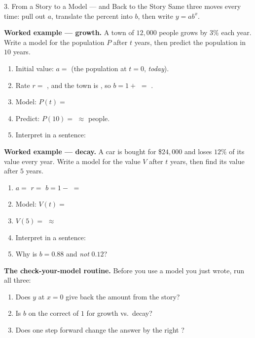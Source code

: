 \documentclass[10pt]{article}
\begin{document}
\begin{notesbox}{3. From a Story to a Model --- and Back to the Story}
Same three moves every time: pull out $a$, translate the percent into $b$, then write $y=ab^{x}$.

\vspace{4pt}
\textbf{Worked example --- growth.} A town of $12{,}000$ people grows by $3\%$ each year. Write a
model for the population $P$ after $t$ years, then predict the population in $10$ years.
\begin{enumerate}[leftmargin=1.7em, itemsep=3pt]
  \item Initial value: $a=$  \quad (the population at $t=0$, \emph{today}).
  \item Rate $r=$ , and the town is , so
        $b=1+$  $=$ .
  \item Model: $P(t)=$ 
  \item Predict: $P(10)=$  $\approx$  people.
  \item Interpret in a sentence: 
\end{enumerate}

\vspace{3pt}
\textbf{Worked example --- decay.} A car is bought for \$$24{,}000$ and loses $12\%$ of its value
every year. Write a model for the value $V$ after $t$ years, then find its value after $5$ years.
\begin{enumerate}[leftmargin=1.7em, itemsep=3pt]
  \item $a=$  \quad $r=$  \quad
        $b=1-$  $=$ 
  \item Model: $V(t)=$ 
  \item $V(5)=$  $\approx$ 
  \item Interpret in a sentence: 
  \item Why is $b=0.88$ and \emph{not} $0.12$? 
\end{enumerate}

\vspace{2pt}
\textbf{The check-your-model routine.} Before you use a model you just wrote, run all three:
\begin{enumerate}[label=(\arabic*), leftmargin=1.9em, itemsep=2pt]
  \item Does $y$ at $x=0$ give back the  amount from the story?
  \item Is $b$ on the correct  of $1$ for growth vs.\ decay?
  \item Does one step forward change the answer by the right ?
\end{enumerate}
\end{notesbox}
\end{document}
